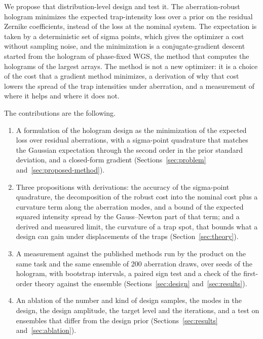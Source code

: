 We propose that distribution-level design and test it. The aberration-robust hologram minimizes the expected trap-intensity loss over a prior on the residual Zernike coefficients, instead of the loss at the
nominal system. The expectation is taken by a deterministic set of sigma points, which gives the optimizer a cost without sampling noise, and the minimization is a conjugate-gradient descent started from the
hologram of phase-fixed WGS, the method that computes the holograms of the largest arrays. The method is not a new optimizer: it is a choice of the cost that a gradient method minimizes, a derivation of why that cost
lowers the spread of the trap intensities under aberration, and a measurement of where it helps and where it does not.

The contributions are the following.
\begin{enumerate}
\item A formulation of the hologram design as the minimization of the expected loss over residual aberrations, with a sigma-point quadrature that matches the Gaussian expectation through the second order in the prior
standard deviation, and a closed-form gradient (Sections~\ref{sec:problem} and~\ref{sec:proposed-method}).
\item Three propositions with derivations: the accuracy of the sigma-point quadrature, the decomposition of the robust cost into the nominal cost plus a curvature term along the aberration modes, and a bound of the
expected squared intensity spread by the Gauss--Newton part of that term; and a derived and measured limit, the curvature of a trap spot, that bounds what a design can gain under displacements of the traps
(Section~\ref{sec:theory}).
\item A measurement against the published methods run by the product on the same task and the same ensemble of 200 aberration draws, over \nSeedsAll{} seeds of the hologram, with bootstrap intervals, a paired sign test
and a check of the first-order theory against the ensemble (Sections~\ref{sec:design} and~\ref{sec:results}).
\item An ablation of the number and kind of design samples, the modes in the design, the design amplitude, the target level and the iterations, and a test on ensembles that differ from the design prior
(Sections~\ref{sec:results} and~\ref{sec:ablation}).
\end{enumerate}

